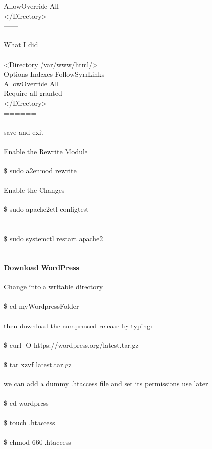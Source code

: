 \documentclass[10pt,a4paper]{article}
\begin{document}
{{{{{{{{{{{{{{{{    AllowOverride All\\
</Directory>\\
------\\
\\
What I did\\
======\\
<Directory /var/www/html/>}{\large \\
        Options Indexes FollowSymLinks\\
        AllowOverride All \\
        Require all granted\\
</Directory>\\
======\\
\\
save and exit\\
\\
Enable the Rewrite Module\\
\\
\$ sudo a2enmod rewrite\\
\\
Enable the Changes\\
\\
\$ sudo apache2ctl configtest\\
\\
\\
\$ sudo systemctl restart apache2\\
\\
\\
\textbf{Download WordPress}}{\large \\
\\
Change into a writable directory \\
\\
\$ cd myWordpressFolder\\
\\
then download the compressed release by typing:\\
\\
\$ curl -O https://wordpress.org/latest.tar.gz}{\large \\
\\
\$ tar xzvf latest.tar.gz\\
\\
we can add a dummy .htaccess file and set its permissions use later\\
\\
\$ cd wordpress\\
\\
\$ touch .htaccess\\
\\
\$ chmod 660 .htaccess\\
}}}}}}}}}}}}}}}}
\end{document}
